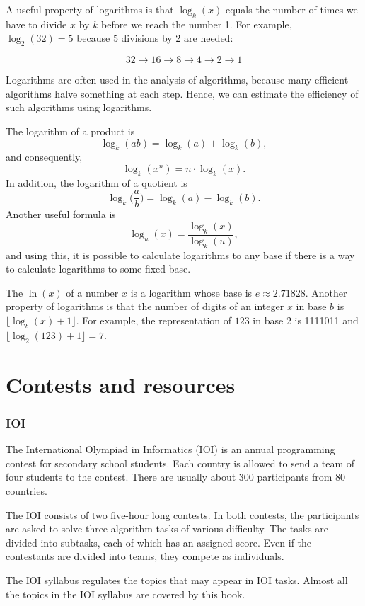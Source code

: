 A useful property of logarithms is
that $\log_k(x)$ equals the number of times
we have to divide $x$ by $k$ before we reach 
the number 1.
For example, $\log_2(32)=5$
because 5 divisions by 2 are needed:

\[32 \rightarrow 16 \rightarrow 8 \rightarrow 4 \rightarrow 2 \rightarrow 1 \]

Logarithms are often used in the analysis of
algorithms, because many efficient algorithms
halve something at each step.
Hence, we can estimate the efficiency of such algorithms
using logarithms.

The logarithm of a product is
\[\log_k(ab) = \log_k(a)+\log_k(b),\]
and consequently,
\[\log_k(x^n) = n \cdot \log_k(x).\]
In addition, the logarithm of a quotient is
\[\log_k\Big(\frac{a}{b}\Big) = \log_k(a)-\log_k(b).\]
Another useful formula is
\[\log_u(x) = \frac{\log_k(x)}{\log_k(u)},\]
and using this, it is possible to calculate
logarithms to any base if there is a way to
calculate logarithms to some fixed base.


The  $\ln(x)$ of a number $x$
is a logarithm whose base is $e \approx 2.71828$.
Another property of logarithms is that
the number of digits of an integer $x$ in base $b$ is
$\lfloor \log_b(x)+1 \rfloor$.
For example, the representation of
$123$ in base $2$ is 1111011 and
$\lfloor \log_2(123)+1 \rfloor = 7$.

\section{Contests and resources}

\subsubsection{IOI}

The International Olympiad in Informatics (IOI)
is an annual programming contest for
secondary school students.
Each country is allowed to send a team of
four students to the contest.
There are usually about 300 participants
from 80 countries.

The IOI consists of two five-hour long contests.
In both contests, the participants are asked to
solve three algorithm tasks of various difficulty.
The tasks are divided into subtasks,
each of which has an assigned score.
Even if the contestants are divided into teams,
they compete as individuals.

The IOI syllabus \cite{iois} regulates the topics
that may appear in IOI tasks.
Almost all the topics in the IOI syllabus
are covered by this book.

